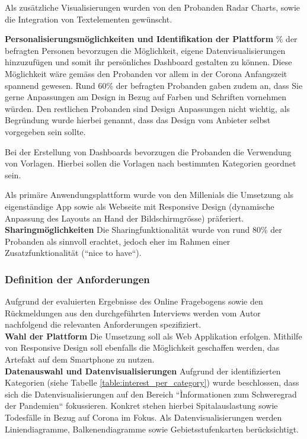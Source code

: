 Als zusätzliche Visualisierungen wurden von den Probanden Radar Charts, sowie die Integration von Textelementen gewünscht.

\clearpage
\noindent
\textbf{Personalisierungsmöglichkeiten und Identifikation der Plattform}
\newline
{}\% der befragten Personen bevorzugen die Möglichkeit, eigene Datenvisualisierungen hinzuzufügen und somit ihr persönliches Dashboard gestalten zu können. Diese Möglichkeit wäre gemäss den Probanden vor allem in der Corona Anfangszeit spannend gewesen. Rund 60\% der befragten Probanden gaben zudem an, dass Sie gerne Anpassungen am Design in Bezug auf Farben und Schriften vornehmen würden. Den restlichen Probanden sind Design Anpassungen nicht wichtig, als Begründung wurde hierbei genannt, dass das Design vom Anbieter selbst vorgegeben sein sollte.

Bei der Erstellung von Dashboards bevorzugen die Probanden die Verwendung von Vorlagen. Hierbei sollen die Vorlagen nach bestimmten Kategorien geordnet sein.

Als primäre Anwendungsplattform wurde von den Millenials die Umsetzung als eigenständige App sowie als Webseite mit Responsive Design (dynamische Anpassung des Layouts an Hand der Bildschirmgrösse) präferiert.\\

\noindent
\textbf{Sharingmöglichkeiten}
\newline
\indent
Die Sharingfunktionalität wurde von rund 80\% der Probanden als sinnvoll erachtet, jedoch eher im Rahmen einer Zusatzfunktionalität (``nice to have``).


\subsubsection{Definition der Anforderungen}
Aufgrund der evaluierten Ergebnisse des Online Fragebogens sowie den Rückmeldungen aus den durchgeführten Interviews werden vom Autor nachfolgend die relevanten Anforderungen spezifiziert.\\

\noindent
\textbf{Wahl der Plattform}
\newline
\indent
Die Umsetzung soll als Web Applikation erfolgen. Mithilfe von Responsive Design soll ebenfalls die Möglichkeit geschaffen werden, das Artefakt auf dem Smartphone zu nutzen.\\

\noindent
\textbf{Datenauswahl und Datenvisualisierungen}
\newline
\indent
Aufgrund der identifizierten Kategorien (siehe Tabelle \ref{table:interest_per_category}) wurde beschlossen, dass sich die Datenvisualisierungen auf den Bereich ``Ìnformationen zum Schweregrad der Pandemien`` fokussieren. Konkret stehen hierbei Spitalauslastung sowie Todesfälle in Bezug auf Corona im Fokus. Als Datenvisualisierungen werden Liniendiagramme, Balkenendiagramme sowie Gebietsstufenkarten berücksichtigt.\\

